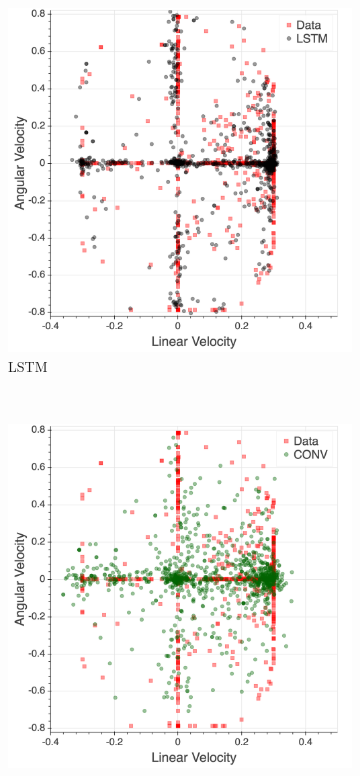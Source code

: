 \documentclass[letterpaper, 10 pt, conference]{ieeeconf}
\begin{document}
\begin{figure}[tbh]
\begin{subfigure}[b]{0.45\columnwidth}
    \includegraphics[scale = 0.08]{images/lstm_dist.png}
    \caption{LSTM}
       \label{fig:data2}
  \end{subfigure} 
  \\
        \begin{subfigure}[b]{0.45\columnwidth}
    \includegraphics[scale = 0.08]{images/short_dist.png}

\end{subfigure}
\end{figure}
\end{document}
